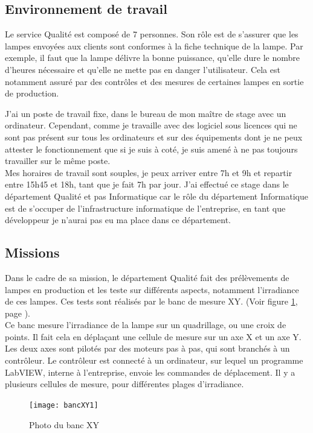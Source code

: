\documentclass[12pt]{article}
\begin{document}
\subsection{Environnement de travail}
Le service Qualité est composé de 7 personnes. 
Son rôle est de s'assurer que les lampes envoyées aux clients sont conformes à la fiche technique de la lampe.
Par exemple, il faut que la lampe délivre la bonne puissance, qu'elle dure le nombre d'heures nécessaire et qu'elle ne mette pas en danger l'utilisateur.
Cela est notamment assuré par des contrôles et des mesures de certaines lampes en sortie de production.


J'ai un poste de travail fixe, dans le bureau de mon maître de stage avec un ordinateur.
Cependant, comme je travaille avec des logiciel sous licences qui ne sont pas présent sur tous les ordinateurs et sur des équipements dont je ne peux attester le fonctionnement que si je suis à coté, je suis amené à ne pas toujours travailler sur le même poste.\\
Mes horaires de travail sont souples, je peux arriver entre 7h et 9h et repartir entre 15h45 et 18h, tant que je fait 7h par jour.
J'ai effectué ce stage dans le département Qualité et pas Informatique car le rôle du département Informatique est de s'occuper de l'infrastructure informatique de l'entreprise, en tant que développeur je n'aurai pas eu ma place dans ce département.
\newpage

\subsection{Missions}


Dans le cadre de sa mission, le département Qualité fait des prélèvements de lampes en production et les teste sur différents aspects, notamment l'\gls{irradiance} de ces lampes.
Ces tests sont réalisés par le banc de mesure XY.
(Voir figure \ref{fig:bancXY1}, page \pageref{fig:bancXY1}).\\
Ce banc mesure l'irradiance de la lampe sur un quadrillage, ou une croix de points.
Il fait cela en déplaçant une cellule de mesure sur un axe X et un axe Y.
Les deux axes sont pilotés par des moteurs pas à pas, qui sont branchés à un contrôleur.
Le contrôleur est connecté à un ordinateur, sur lequel un programme LabVIEW, interne à l'entreprise, envoie les commandes de déplacement.
Il y a plusieurs cellules de mesure, pour différentes plages d'irradiance.\\
\begin{figure}[htb]
	\centering
	\texttt{[image: bancXY1]}
	\caption{Photo du banc XY}
	\label{fig:bancXY1}
\end{figure}
\end{document}
